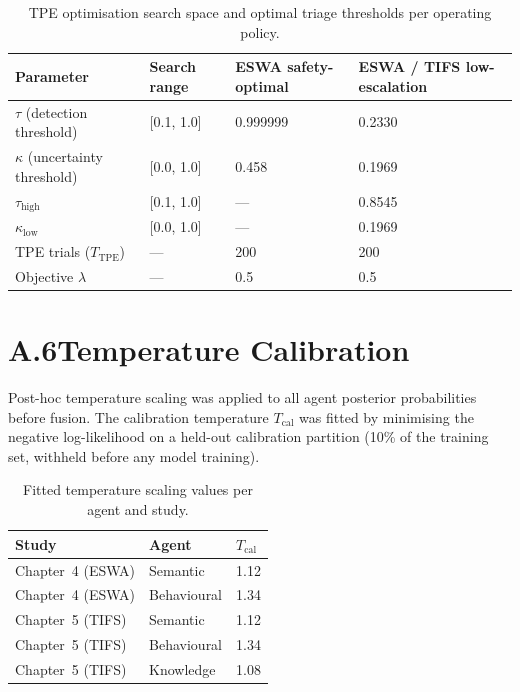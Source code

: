 \begin{table}[ht]
\centering
\caption{TPE optimisation search space and optimal triage thresholds per operating policy.}
\label{tab:app_tpe}
\begin{tabular}{@{}llll@{}}
\toprule
\textbf{Parameter} & \textbf{Search range} & \textbf{ESWA safety-optimal}
                   & \textbf{ESWA / TIFS low-escalation} \\
\midrule
$\tau$ (detection threshold)        & [0.1, 1.0] & 0.999999 & 0.2330 \\
$\kappa$ (uncertainty threshold)    & [0.0, 1.0] & 0.458    & 0.1969 \\
$\tau_{\mathrm{high}}$              & [0.1, 1.0] & ---      & 0.8545 \\
$\kappa_{\mathrm{low}}$             & [0.0, 1.0] & ---      & 0.1969 \\
TPE trials ($T_{\mathrm{TPE}}$)     & ---        & 200      & 200    \\
Objective $\lambda$                 & ---        & 0.5      & 0.5    \\
\bottomrule
\end{tabular}
\end{table}

\section*{A.6\quad Temperature Calibration}

Post-hoc temperature scaling \cite{guo2017calibration} was applied to all agent posterior
probabilities before fusion.
The calibration temperature $T_{\mathrm{cal}}$ was fitted by minimising the negative
log-likelihood on a held-out calibration partition (10\% of the training set, withheld
before any model training).

\begin{table}[ht]
\centering
\caption{Fitted temperature scaling values per agent and study.}
\label{tab:app_temp}
\begin{tabular}{@{}lll@{}}
\toprule
\textbf{Study} & \textbf{Agent} & \textbf{$T_{\mathrm{cal}}$} \\
\midrule
Chapter~4 (ESWA) & Semantic     & 1.12 \\
Chapter~4 (ESWA) & Behavioural  & 1.34 \\
Chapter~5 (TIFS) & Semantic     & 1.12 \\
Chapter~5 (TIFS) & Behavioural  & 1.34 \\
Chapter~5 (TIFS) & Knowledge    & 1.08 \\
\bottomrule
\end{tabular}
\end{table}
